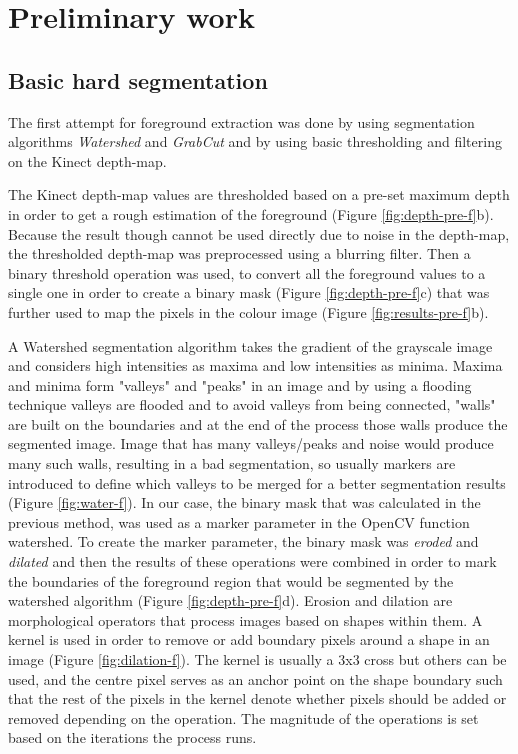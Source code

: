\chapter{Preliminary work}
\label{sec:preliminary-work}

\section{Basic hard segmentation}
\label{sec:basic-segmentation}

The first attempt for foreground extraction was done by using segmentation algorithms \textit{Watershed} \cite{watershed} and \textit{GrabCut} \cite{grabcut} and by using basic thresholding and filtering on the Kinect depth-map.
\par
The Kinect depth-map values are thresholded based on a pre-set maximum depth in order to get a rough estimation of the foreground (Figure \ref{fig:depth-pre-f}b). Because the result though cannot be used directly due to noise in the depth-map, the thresholded depth-map was preprocessed using a blurring filter. Then a binary threshold operation was used, to convert all the foreground values to a single one in order to create a binary mask (Figure \ref{fig:depth-pre-f}c) that was further used to map the pixels in the colour image (Figure \ref{fig:results-pre-f}b).
\par
A Watershed segmentation algorithm takes the gradient of the grayscale image and considers high intensities as maxima and low intensities as minima. Maxima and minima form "valleys" and "peaks" in an image and by using a flooding technique valleys are flooded and to avoid valleys from being connected, "walls" are built on the boundaries and at the end of the process those walls produce the segmented image. Image that has many valleys/peaks and noise would produce many such walls, resulting in a bad segmentation, so usually markers are introduced to define which valleys to be merged for a better segmentation results (Figure \ref{fig:water-f}). In our case, the binary mask that was calculated in the previous method, was used as a marker parameter in the OpenCV function watershed. To create the marker parameter, the binary mask was \textit{eroded} and \textit{dilated} and then the results of these operations were combined in order to mark the boundaries of the foreground region that would be segmented by the watershed algorithm (Figure \ref{fig:depth-pre-f}d). Erosion and dilation are morphological operators that process images based on shapes within them. A kernel is used in order to remove or add boundary pixels around a shape in an image (Figure \ref{fig:dilation-f}). The kernel is usually a 3x3 cross but others can be used, and the centre pixel serves as an anchor point on the shape boundary such that the rest of the pixels in the kernel denote whether pixels should be added or removed depending on the operation. The magnitude of the operations is set based on the iterations the process runs.

